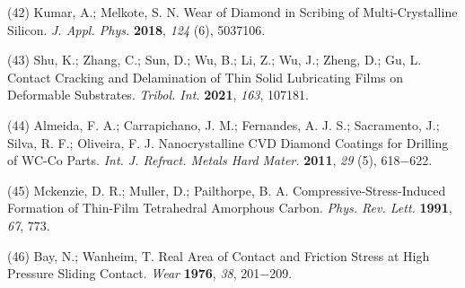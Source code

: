 \documentclass{article}
\begin{document}
\begin{hangpars}
(42) Kumar, A.; Melkote, S. N. Wear of Diamond in Scribing of Multi-Crystalline Silicon. \textit{J. Appl. Phys.} \textbf{2018}, \textit{124} (6), 5037106.

(43) Shu, K.; Zhang, C.; Sun, D.; Wu, B.; Li, Z.; Wu, J.; Zheng, D.; Gu, L. Contact Cracking and Delamination of Thin Solid Lubricating Films on Deformable Substrates. \textit{Tribol. Int.} \textbf{2021}, \textit{163}, 107181.

(44) Almeida, F. A.; Carrapichano, J. M.; Fernandes, A. J. S.; Sacramento, J.; Silva, R. F.; Oliveira, F. J. Nanocrystalline CVD Diamond Coatings for Drilling of WC-Co Parts. \textit{Int. J. Refract. Metals Hard Mater.} \textbf{2011}, \textit{29} (5), 618−622.

(45) Mckenzie, D. R.; Muller, D.; Pailthorpe, B. A. Compressive-Stress-Induced Formation of Thin-Film Tetrahedral Amorphous Carbon. \textit{Phys. Rev. Lett.} \textbf{1991}, \textit{67}, 773.

(46) Bay, N.; Wanheim, T. Real Area of Contact and Friction Stress at High Pressure Sliding Contact. \textit{Wear} \textbf{1976}, \textit{38}, 201−209.
\end{hangpars}
\end{document}
